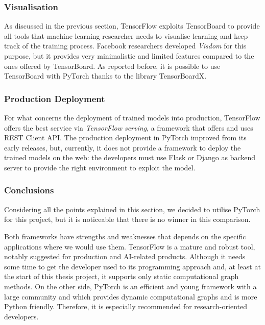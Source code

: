\subsubsection{Visualisation}

As discussed in the previous section, TensorFlow exploits TensorBoard to provide all tools that machine learning researcher needs to visualise learning and keep track of the training process. Facebook researchers developed \textit{Visdom} for this purpose, but it provides very minimalistic and limited features compared to the ones offered by TensorBoard. As reported before, it is possible to use TensorBoard with PyTorch thanks to the library TensorBoardX.

\subsubsection{Production Deployment}

For what concerns the deployment of trained models into production, TensorFlow offers the best service via \textit{TensorFlow serving}, a framework that offers and uses REST Client API.
The production deployment in PyTorch improved from its early releases, but, currently, it does not provide a framework to deploy the trained models on the web: the developers must use Flask or Django as backend server to provide the right environment to exploit the model.

\subsubsection{Conclusions}

Considering all the points explained in this section, we decided to utilise PyTorch for this project, but it is noticeable that there is no winner in this comparison.

Both frameworks have strengths and weaknesses that depends on the specific applications where we would use them.
TensorFlow is a mature and robust tool, notably suggested for production and AI-related products. Although it needs some time to get the developer used to its programming approach and, at least at the start of this thesis project,  it supports only static computational graph methods. On the other side, PyTorch is an efficient and young framework with a large community and which provides dynamic computational graphs and is more Python friendly. Therefore, it is especially recommended for research-oriented developers.